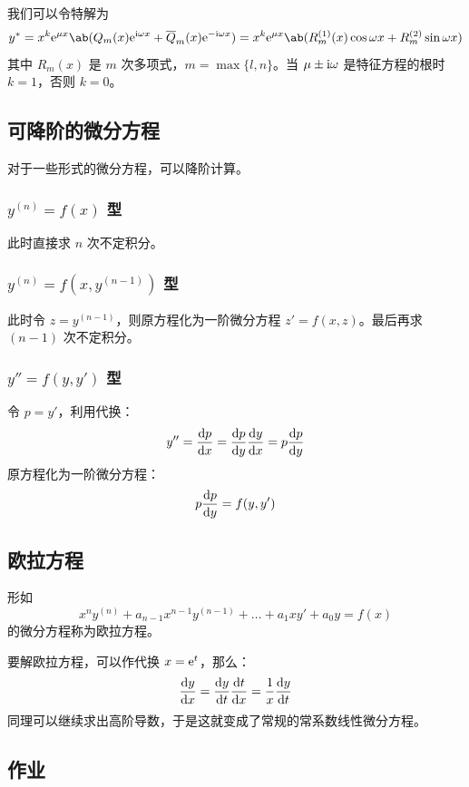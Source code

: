 我们可以令特解为
$$
y^* = x^{k} \E^{\mu x} \ab(Q_m(x) \E^{\I \omega x} + \overline{Q}_m(x) \E^{-\I \omega x}) = x^{k} \E^{\mu x} \ab(R_m^{(1)}(x) \cos \omega x + R_m^{(2)} \sin \omega x)
$$
其中 $R_m(x)$ 是 $m$ 次多项式，$m = \max\{l, n\}$。当 $\mu \pm \mathrm{i} \omega$ 是特征方程的根时 $k = 1$，否则 $k = 0$。 

\subsection{可降阶的微分方程}

对于一些形式的微分方程，可以降阶计算。

\subsubsection{$y^{(n)} = f(x)$ 型}

此时直接求 $n$ 次不定积分。

\subsubsection{$y^{(n)} = f(x, y^{(n - 1)})$ 型}

此时令 $z = y^{(n - 1)}$，则原方程化为一阶微分方程 $z' = f(x, z)$。最后再求 $(n - 1)$ 次不定积分。

\subsubsection{$y'' = f(y, y')$ 型}

令 $p = y'$，利用代换：
$$
y'' = \dv{p}{x} = \dv{p}{y} \dv{y}{x} = p \dv{p}{y}
$$
原方程化为一阶微分方程：
$$
p \dv{p}{y} = f(y, y')
$$

\subsection{欧拉方程}

\begin{definition}
    形如
    $$
    x^n y^{(n)} + a_{n - 1} x^{n - 1} y^{(n - 1)} + \dots + a_1 x y' + a_0 y = f(x)
    $$
    的微分方程称为欧拉方程。
\end{definition}

要解欧拉方程，可以作代换 $x = \mathrm{e}^{t}$，那么：
$$
\dv{y}{x} = \dv{y}{t} \dv{t}{x} = \frac{1}{x} \dv{y}{t}
$$
同理可以继续求出高阶导数，于是这就变成了常规的常系数线性微分方程。

\subsection{作业}


